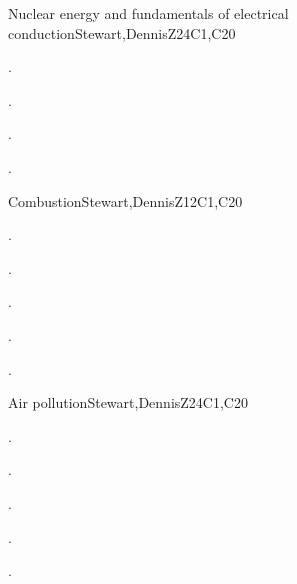 \begin{syllabus}
\begin{unit}{}{Nuclear energy and fundamentals of electrical conduction}{Stewart,DennisZ}{24}{C1,C20}
   \begin{learningoutcomes}
    \item . %
    \item . %
    \item . %
    \item . %
    \end{learningoutcomes}
\end{unit}

\begin{unit}{}{Combustion}{Stewart,DennisZ}{12}{C1,C20}
  \begin{topics}
    \item . %
    \item . %
   \end{topics}
  
  \begin{learningoutcomes}
    \item . %
    \item . %
    \item . %
    \end{learningoutcomes}

\end{unit}

\begin{unit}{}{Air pollution}{Stewart,DennisZ}{24}{C1,C20}
   \begin{topics}
    \item . %
    \item . %
 \end{topics}

   \begin{learningoutcomes}
    \item . %
    \item . %
    \item . %
      \end{learningoutcomes}
\end{unit}


\end{syllabus}
